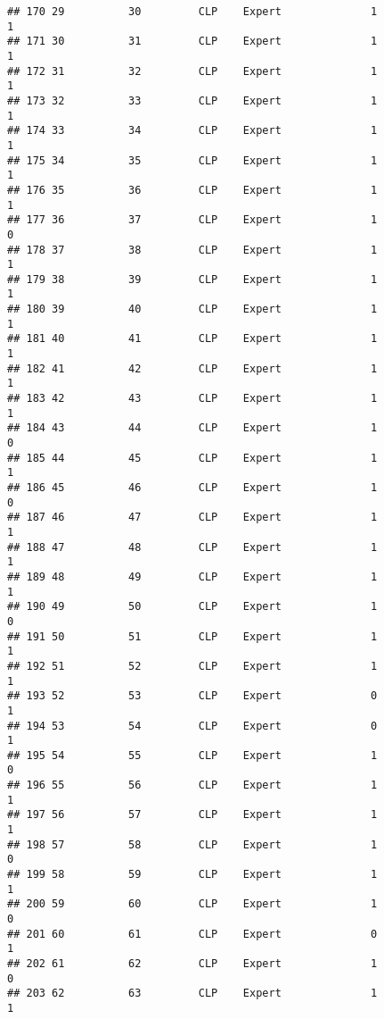 \documentclass[
]{article}
\begin{document}
\begin{verbatim}
## 170 29          30         CLP    Expert              1                 1
## 171 30          31         CLP    Expert              1                 1
## 172 31          32         CLP    Expert              1                 1
## 173 32          33         CLP    Expert              1                 1
## 174 33          34         CLP    Expert              1                 1
## 175 34          35         CLP    Expert              1                 1
## 176 35          36         CLP    Expert              1                 1
## 177 36          37         CLP    Expert              1                 0
## 178 37          38         CLP    Expert              1                 1
## 179 38          39         CLP    Expert              1                 1
## 180 39          40         CLP    Expert              1                 1
## 181 40          41         CLP    Expert              1                 1
## 182 41          42         CLP    Expert              1                 1
## 183 42          43         CLP    Expert              1                 1
## 184 43          44         CLP    Expert              1                 0
## 185 44          45         CLP    Expert              1                 1
## 186 45          46         CLP    Expert              1                 0
## 187 46          47         CLP    Expert              1                 1
## 188 47          48         CLP    Expert              1                 1
## 189 48          49         CLP    Expert              1                 1
## 190 49          50         CLP    Expert              1                 0
## 191 50          51         CLP    Expert              1                 1
## 192 51          52         CLP    Expert              1                 1
## 193 52          53         CLP    Expert              0                 1
## 194 53          54         CLP    Expert              0                 1
## 195 54          55         CLP    Expert              1                 0
## 196 55          56         CLP    Expert              1                 1
## 197 56          57         CLP    Expert              1                 1
## 198 57          58         CLP    Expert              1                 0
## 199 58          59         CLP    Expert              1                 1
## 200 59          60         CLP    Expert              1                 0
## 201 60          61         CLP    Expert              0                 1
## 202 61          62         CLP    Expert              1                 0
## 203 62          63         CLP    Expert              1                 1

\end{verbatim}
\end{document}
